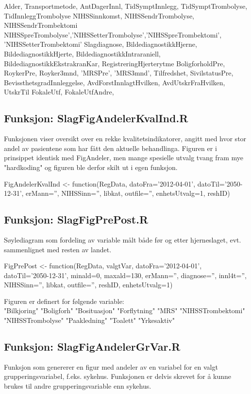 \documentclass [norsk,a4paper,twoside]{article}
\begin{document}
Alder, Transportmetode,
AntDagerInnl, TidSymptInnlegg, TidSymptTrombolyse, TidInnleggTrombolyse
NIHSSinnkomst, NIHSSendrTrombolyse, NIHSSendrTrombektomi
NIHSSpreTrombolyse','NIHSSetterTrombolyse','NIHSSpreTrombektomi', 'NIHSSetterTrombektomi'
Slagdiagnose, BildediagnostikkHjerne, BildediagnostikkHjerte,
BildediagnostikkIntraraniell, BildediagnostikkEkstrakranKar, RegistreringHjerterytme
BoligforholdPre, RoykerPre, Royker3mnd, 'MRSPre', 'MRS3mnd', Tilfredshet,
SivilstatusPre, BevissthetsgradInnleggelse, 
AvdForstInnlagtHvilken, AvdUtskrFraHvilken, UtskrTil
FokaleUtf, FokaleUtfAndre,



\subsection{Funksjon: SlagFigAndelerKvalInd.R}
Funksjonen viser oversikt over en rekke kvalitetsindikatorer, angitt med hvor stor andel av pasientene som har fått den aktuelle behandlinga. Figuren er i prinsippet identisk med FigAndeler, men mange spesielle utvalg tvang fram mye "hardkoding" og figuren ble derfor skilt ut i egen funksjon. 

FigAndelerKvalInd  <- function(RegData, datoFra='2012-04-01', datoTil='2050-12-31', 
erMann='', NIHSSinn='', libkat, outfile='', enhetsUtvalg=1, reshID)



\subsection{Funksjon: SlagFigPrePost.R}
Søylediagram som fordeling av variable målt både før og etter hjerneslaget, evt. sammenlignet med resten av landet. 


FigPrePost  <- function(RegData, valgtVar, datoFra='2012-04-01', datoTil='2050-12-31', 
minald=0, maxald=130, erMann='', diagnose='', innl4t='', NIHSSinn='', libkat, outfile='', 
reshID, enhetsUtvalg=1)

Figuren er definert for følgende variable: \\
 "Bilkjoring"       "Boligforh"        "Bosituasjon"      "Forflytning"      "MRS"             
 "NIHSSTrombektomi" "NIHSSTrombolyse"  "Paakledning"      "Toalett"          "Yrkesaktiv" 



\subsection{Funksjon: SlagFigAndelerGrVar.R}
Funksjon som genererer en figur med andeler av en variabel for en valgt grupperingsvariabel,
f.eks. sykehus.
Funksjonen er delvis skrevet for å kunne brukes til andre grupperingsvariable enn sykehus.
\end{document}
